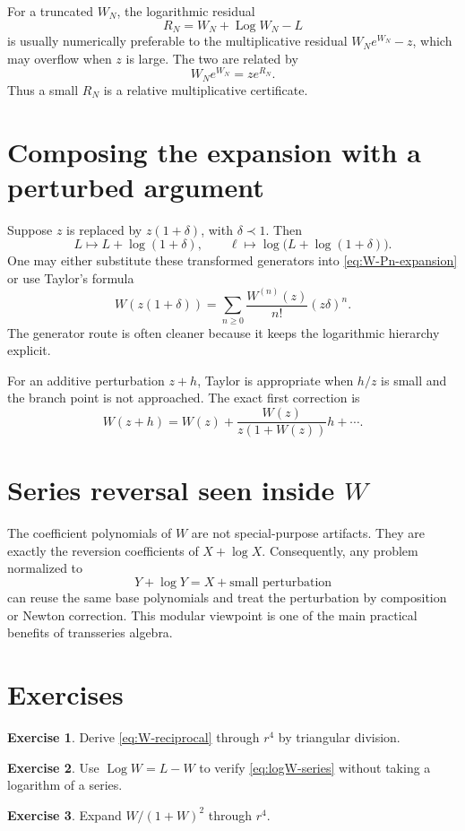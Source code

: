\documentclass[11pt,openany]{book}
\theoremstyle{definition}
\newtheorem{exercise}{Exercise}[chapter]
\theoremstyle{plain}
\theoremstyle{remark}
\newcommand{\precdom}{\prec}
\DeclareMathOperator{\Log}{Log}
\begin{document}
For a truncated \(W_N\), the logarithmic residual
\[
 R_N=W_N+\Log W_N-L
\]
is usually numerically preferable to the multiplicative residual \(W_Ne^{W_N}-z\), which may overflow when \(z\) is large. The two are related by
\[
 W_Ne^{W_N}=z e^{R_N}.
\]
Thus a small \(R_N\) is a relative multiplicative certificate.

\section{Composing the expansion with a perturbed argument}
Suppose \(z\) is replaced by \(z(1+\delta)\), with \(\delta\precdom1\). Then
\[
 L\mapsto L+\log(1+\delta),
 \qquad
 \ell\mapsto\log\bigl(L+\log(1+\delta)\bigr).
\]
One may either substitute these transformed generators into \cref{eq:W-Pn-expansion} or use Taylor's formula
\begin{equation}\label{eq:W-argument-Taylor}
 W(z(1+\delta))
 =\sum_{n\ge0}\frac{W^{(n)}(z)}{n!}(z\delta)^n.
\end{equation}
The generator route is often cleaner because it keeps the logarithmic hierarchy explicit.

For an additive perturbation \(z+h\), Taylor is appropriate when \(h/z\) is small and the branch point is not approached. The exact first correction is
\[
 W(z+h)=W(z)+\frac{W(z)}{z(1+W(z))}h+\cdots.
\]

\section{Series reversal seen inside \texorpdfstring{\(W\)}{W}}
The coefficient polynomials of \(W\) are not special-purpose artifacts. They are exactly the reversion coefficients of \(X+\log X\). Consequently, any problem normalized to
\[
 Y+\log Y=X+\text{small perturbation}
\]
can reuse the same base polynomials and treat the perturbation by composition or Newton correction. This modular viewpoint is one of the main practical benefits of transseries algebra.

\section{Exercises}
\begin{exercise}
Derive \cref{eq:W-reciprocal} through \(r^4\) by triangular division.
\end{exercise}
\begin{exercise}
Use \(\Log W=L-W\) to verify \cref{eq:logW-series} without taking a logarithm of a series.
\end{exercise}
\begin{exercise}
Expand \(W/(1+W)^2\) through \(r^4\).
\end{exercise}
\end{document}
